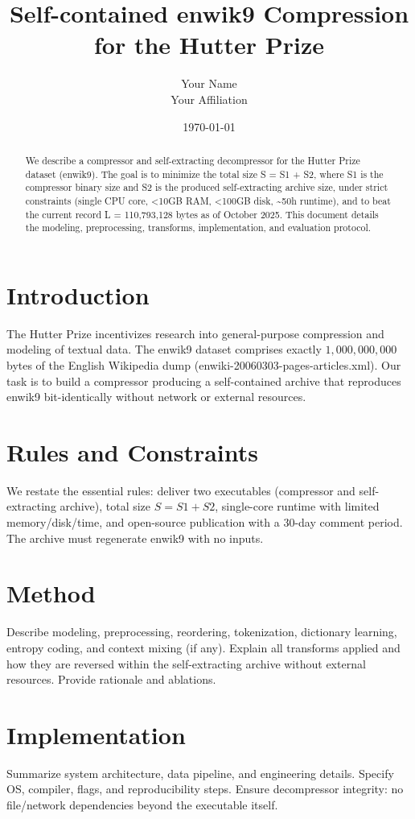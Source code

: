 \documentclass[11pt]{article}
\title{Self-contained enwik9 Compression for the Hutter Prize}
\author{Your Name\\Your Affiliation}
\date{\today}
\begin{document}
\maketitle

\begin{abstract}
We describe a compressor and self-extracting decompressor for the Hutter Prize dataset (enwik9). The goal is to minimize the total size S = S1 + S2, where S1 is the compressor binary size and S2 is the produced self-extracting archive size, under strict constraints (single CPU core, <10GB RAM, <100GB disk, \textasciitilde{}\leq50h runtime), and to beat the current record L = 110{,}793{,}128 bytes as of October 2025. This document details the modeling, preprocessing, transforms, implementation, and evaluation protocol.
\end{abstract}

\section{Introduction}
The Hutter Prize incentivizes research into general-purpose compression and modeling of textual data. The enwik9 dataset comprises exactly $1{,}000{,}000{,}000$ bytes of the English Wikipedia dump (enwiki-20060303-pages-articles.xml). Our task is to build a compressor producing a self-contained archive that reproduces enwik9 bit-identically without network or external resources.

\section{Rules and Constraints}
We restate the essential rules: deliver two executables (compressor and self-extracting archive), total size $S = S1 + S2$, single-core runtime with limited memory/disk/time, and open-source publication with a 30-day comment period. The archive must regenerate enwik9 with no inputs.

\section{Method}
Describe modeling, preprocessing, reordering, tokenization, dictionary learning, entropy coding, and context mixing (if any). Explain all transforms applied and how they are reversed within the self-extracting archive without external resources. Provide rationale and ablations.

\section{Implementation}
Summarize system architecture, data pipeline, and engineering details. Specify OS, compiler, flags, and reproducibility steps. Ensure decompressor integrity: no file/network dependencies beyond the executable itself.
\end{document}
